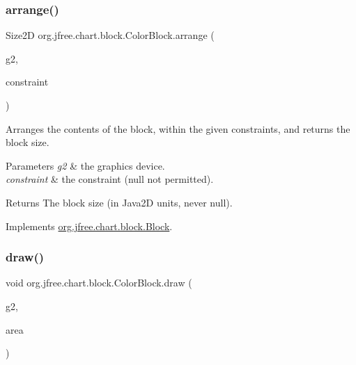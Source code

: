 \subsubsection{\texorpdfstring{arrange()}{arrange()}}
{\footnotesize\ttfamily Size2D org.\+jfree.\+chart.\+block.\+Color\+Block.\+arrange (\begin{DoxyParamCaption}\item[{Graphics2D}]{g2,  }\item[{\mbox{\hyperlink{classorg_1_1jfree_1_1chart_1_1block_1_1_rectangle_constraint}{Rectangle\+Constraint}}}]{constraint }\end{DoxyParamCaption})}

Arranges the contents of the block, within the given constraints, and returns the block size.


\begin{DoxyParams}{Parameters}
{\em g2} & the graphics device. \\
\hline
{\em constraint} & the constraint ({\ttfamily null} not permitted).\\
\hline
\end{DoxyParams}
\begin{DoxyReturn}{Returns}
The block size (in Java2D units, never {\ttfamily null}). 
\end{DoxyReturn}


Implements \mbox{\hyperlink{interfaceorg_1_1jfree_1_1chart_1_1block_1_1_block_ab4cabbc237c5277a4a0018bab930e5fe}{org.\+jfree.\+chart.\+block.\+Block}}.

\mbox{\label{classorg_1_1jfree_1_1chart_1_1block_1_1_color_block_a6ec243ee9e68115d14be1cd98d75be25}} 
\subsubsection{\texorpdfstring{draw()}{draw()}\hspace{0.1cm}{\footnotesize\ttfamily [1/2]}}
{\footnotesize\ttfamily void org.\+jfree.\+chart.\+block.\+Color\+Block.\+draw (\begin{DoxyParamCaption}\item[{Graphics2D}]{g2,  }\item[{Rectangle2D}]{area }\end{DoxyParamCaption})}

